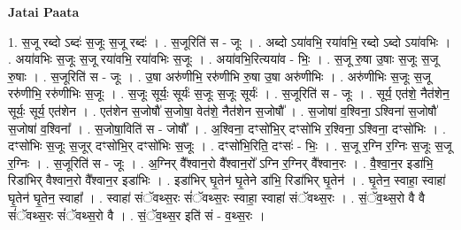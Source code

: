 \documentclass[17pt]{extarticle}
\begin{document}
\textbf{Jatai Paata} \newline

1. स॒जू रब्दो ऽब्दः॑ स॒जूः स॒जू रब्दः॑ । . स॒जूरिति॑ स - जूः । . अब्दो ऽया॑वभि॒ रया॑वभि॒ रब्दो ऽब्दो ऽया॑वभिः । . अया॑वभिः स॒जूः स॒जू रया॑वभि॒ रया॑वभिः स॒जूः । . अया॑वभि॒रित्यया॑व - भिः॒ । . स॒जू रु॒षा उ॒षाः स॒जूः स॒जू रु॒षाः । . स॒जूरिति॑ स - जूः । . उ॒षा अरु॑णीभि॒ ररु॑णीभि रु॒षा उ॒षा अरु॑णीभिः । . अरु॑णीभिः स॒जूः स॒जू ररु॑णीभि॒ ररु॑णीभिः स॒जूः । . स॒जूः सूर्यः॒ सूर्यः॑ स॒जूः स॒जूः सूर्यः॑ । . स॒जूरिति॑ स - जूः । . सूर्य॒ एत॑शे॒ नैत॑शेन॒ सूर्यः॒ सूर्य॒ एत॑शेन । . एत॑शेन स॒जोषौ॑ स॒जोषा॒ वेत॑शे॒ नैत॑शेन स॒जोषौ᳚ । . स॒जोषा॑ व॒श्विना॒ ऽश्विना॑ स॒जोषौ॑ स॒जोषा॑ व॒श्विना᳚ । . स॒जोषा॒विति॑ स - जोषौ᳚ । . अ॒श्विना॒ दꣳसो॑भि॒र् दꣳसो॑भि र॒श्विना॒ ऽश्विना॒ दꣳसो॑भिः । . दꣳसो॑भिः स॒जूः स॒जूर् दꣳसो॑भि॒र् दꣳसो॑भिः स॒जूः । . दꣳसो॑भि॒रिति॒ दꣳसः॑ - भिः॒ । . स॒जू र॒ग्नि र॒ग्निः स॒जूः स॒जू र॒ग्निः । . स॒जूरिति॑ स - जूः । . अ॒ग्निर् वै᳚श्वान॒रो वै᳚श्वान॒रो᳚ ऽग्नि र॒ग्निर् वै᳚श्वान॒रः । . वै॒श्वा॒न॒र इडा॑भि॒ रिडा॑भिर् वैश्वान॒रो वै᳚श्वान॒र इडा॑भिः । . इडा॑भिर् घृ॒तेन॑ घृ॒तेने डा॑भि॒ रिडा॑भिर् घृ॒तेन॑ । . घृ॒तेन॒ स्वाहा॒ स्वाहा॑ घृ॒तेन॑ घृ॒तेन॒ स्वाहा᳚ । . स्वाहा॑ संॅवथ्स॒रः सं॑ॅवथ्स॒रः स्वाहा॒ स्वाहा॑ संॅवथ्स॒रः । . सं॒ॅव॒थ्स॒रो वै वै सं॑ॅवथ्स॒रः सं॑ॅवथ्स॒रो वै । . सं॒ॅव॒थ्स॒र इति॑ सं - व॒थ्स॒रः । \newline
\end{document}

